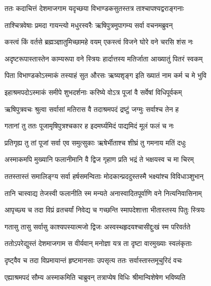 \twolineshloka
{ततः कदाचित्तं देशमाजगाम यदृच्छया}
{विभाण्डकसुतस्तत्र ताश्चापश्यद्वराङ्गनाः} %

\twolineshloka
{ताश्चित्रवेषाः प्रमदा गायन्त्यो मधुरस्वरैः}
{ऋषिपुत्रमुपागम्य सर्वा वचनमब्रुवन्} %

\twolineshloka
{कस्त्वं किं वर्तसे ब्रह्मञ्ज्ञातुमिच्छामहे वयम्}
{एकस्त्वं विजने घोरे वने चरसि शंस नः} %

\twolineshloka
{अदृष्टरूपास्तास्तेन काम्यरूपा वने स्त्रियः}
{हार्दात्तस्य मतिर्जाता आख्यातुं पितरं स्वकम्} %

\twolineshloka
{पिता विभाण्डकोऽस्माकं तस्याहं सुत औरसः}
{ऋष्यशृङ्ग इति ख्यातं नाम कर्म च मे भुवि} %

\twolineshloka
{इहाश्रमपदोऽस्माकं समीपे शुभदर्शनाः}
{करिष्ये वोऽत्र पूजां वै सर्वेषां विधिपूर्वकम्} %

\twolineshloka
{ऋषिपुत्रवचः श्रुत्वा सर्वासां मतिरास वै}
{तदाश्रमपदं द्रष्टुं जग्मुः सर्वाश्च तेन ह} %

\twolineshloka
{गतानां तु ततः पूजामृषिपुत्रश्चकार ह}
{इदमर्घ्यमिदं पाद्यमिदं मूलं फलं च नः} %

\twolineshloka
{प्रतिगृह्य तु तां पूजां सर्वा एव समुत्सुकाः}
{ऋषेर्भीताश्च शीघ्रं तु गमनाय मतिं दधुः} %

\twolineshloka
{अस्माकमपि मुख्यानि फलानीमानि वै द्विज}
{गृहाण प्रति भद्रं ते भक्षयस्व च मा चिरम्} %

\twolineshloka
{ततस्तास्तं समालिङ्ग्य सर्वा हर्षसमन्विताः}
{मोदकान्प्रददुस्तस्मै भक्ष्यांश्च विविधाञ्शुभान्} %

\twolineshloka
{तानि चास्वाद्य तेजस्वी फलानीति स्म मन्यते}
{अनास्वादितपूर्वाणि वने नित्यनिवासिनाम्} %

\twolineshloka
{आपृच्छ्य च तदा विप्रं व्रतचर्यां निवेद्य च}
{गच्छन्ति स्मापदेशात्ता भीतास्तस्य पितुः स्त्रियः} %

\twolineshloka
{गतासु तासु सर्वासु काश्यपस्यात्मजो द्विजः}
{अस्वस्थहृदयश्चासीद्दुःखं स्म परिवर्तते} %

\twolineshloka
{ततोऽपरेद्युस्तं देशमाजगाम स वीर्यवान्}
{मनोज्ञा यत्र ता दृष्टा वारमुख्याः स्वलंकृताः} %

\twolineshloka
{दृष्ट्वैव च तदा विप्रमायान्तं हृष्टमानसाः}
{उपसृत्य ततः सर्वास्तास्तमूचुरिदं वचः} %

\twolineshloka
{एह्याश्रमपदं सौम्य अस्माकमिति चाब्रुवन्}
{तत्राप्येष विधिः श्रीमान्विशेषेण भविष्यति} %

